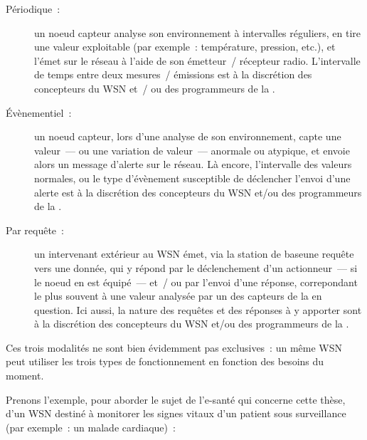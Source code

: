 \begin{description}

\item[Périodique~:] un noeud capteur analyse son environnement à
intervalles réguliers, en tire une valeur exploitable (par exemple~:
température, pression, etc.), et l'émet sur le réseau à l'aide
de son émetteur~/ récepteur radio. L'intervalle de temps entre
deux mesures~/ émissions est à la discrétion des concepteurs
du WSN et~/ ou des programmeurs de la .

\item[\'Evènementiel~:] un noeud capteur, lors d'une analyse de
son environnement, capte une valeur~--- ou une variation de valeur~---
anormale ou atypique, et envoie alors un message d'alerte sur le
réseau. Là encore, l'intervalle des valeurs normales, ou le type
d'évènement susceptible de déclencher l'envoi d'une alerte est
à la discrétion des concepteurs du WSN et/ou des programmeurs
de la .

\item[Par requête~:] un intervenant extérieur au WSN émet, via
la station de base\footnotemark[1] une requête vers une 
donnée, qui y répond par le déclenchement d'un actionneur~--- si
le noeud en est équipé~--- et~/ ou par l'envoi d'une réponse,
correpondant le plus souvent à une valeur analysée par un des
capteurs de la  en question. Ici aussi, la nature des
requêtes et des réponses à y apporter sont à la discrétion des
concepteurs du WSN et/ou des programmeurs de la .


\end{description}

Ces trois modalités ne sont bien évidemment pas exclusives~: un même
WSN peut utiliser les trois types de fonctionnement en fonction des
besoins du moment.

Prenons l'exemple, pour aborder le sujet de l'e-santé qui concerne
cette thèse, d'un WSN destiné à monitorer les signes vitaux d'un
patient sous surveillance (par exemple~: un malade cardiaque)~:

